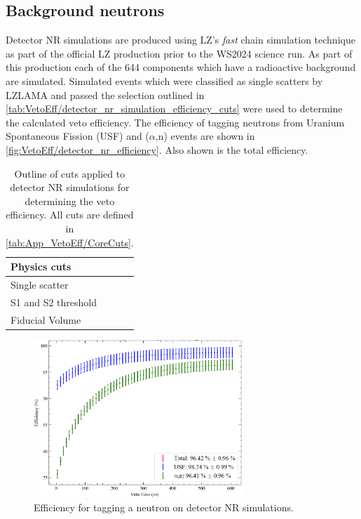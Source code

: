 \subsection{Background neutrons}
Detector NR simulations are produced using LZ's \textit{fast} chain simulation technique as part of the official LZ production prior to the WS2024 science run.
As part of this production each of the 644 components which have a radioactive background are simulated.
Simulated events which were classified as single scatters by LZLAMA and passed the selection outlined in \autoref{tab:VetoEff/detector_nr_simulation_efficiency_cuts} were used to determine the calculated veto efficiency.
The efficiency of tagging neutrons from Uranium Spontaneous Fission (USF) and ($\alpha$,n) events are shown in \autoref{fig:VetoEff/detector_nr_efficiency}. Also shown is the total efficiency.

\begin{table}[!ht]
	\centering
	\caption{Outline of cuts applied to detector NR simulations for determining the veto efficiency. All cuts are defined in \autoref{tab:App_VetoEff/CoreCuts}.}
	\begin{tabular}{l}
    \hline\hline
		\textbf{Physics cuts}\\
		\hline
		Single scatter\\
		S1 and S2 threshold\\
		Fiducial Volume\\
        \hline\hline
	\end{tabular}
	\label{tab:VetoEff/detector_nr_simulation_efficiency_cuts}
\end{table}

\begin{figure}[!ht]
	\centering
	\includegraphics[width=0.7\textwidth]{figures/VetoEfficiency/det_nr_efficiency.png}
	\caption{Efficiency for tagging a neutron on detector NR simulations.}
	\label{fig:VetoEff/detector_nr_efficiency}
\end{figure}

